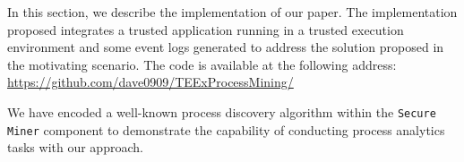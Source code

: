 In this section, we describe the implementation of our paper. The implementation proposed integrates a trusted application running in a
trusted execution environment and some event logs generated to address the solution proposed in the motivating scenario. The code is available at the following address: \url{https://github.com/dave0909/TEExProcessMining/}

We have encoded a well-known process discovery algorithm within the \texttt{Secure Miner} component to demonstrate the capability of conducting process analytics tasks with our approach.

